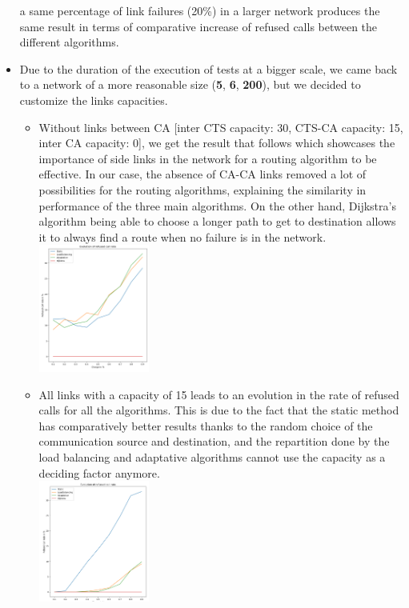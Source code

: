 \documentclass[lettersize,journal]{IEEEtran} %
\begin{document}
\begin{itemize}
        a same percentage of link failures (20\%) in a larger network produces the same result in terms of comparative increase of refused calls
        between the different algorithms. 
        \item Due to the duration of the execution of tests at a bigger scale, we came back to a network of a more reasonable size
        (\textbf{5}, \textbf{6}, \textbf{200}), but we decided to customize the links capacities.
        \begin{itemize}
                \item Without links between CA [inter CTS capacity: 30, CTS-CA capacity: 15, inter CA capacity: 0], we get the result that follows
                which showcases the importance of side links in the network for a routing algorithm to be effective. In our case, the absence
                of CA-CA links removed a lot of possibilities for the routing algorithms, explaining the similarity in performance of the three
                main algorithms. On the other hand, Dijkstra's algorithm being able to choose a longer path to get to destination allows it to
                always find a route when no failure is in the network.
                \includegraphics[width=0.3\textwidth]{images/without_CA_links_1.png}
                \item All links with a capacity of 15 leads to an evolution in the rate of refused calls for
                all the algorithms. This is due to the fact that the static method has comparatively better results thanks to the random choice of the
                communication source and destination, and the repartition done by the load balancing and adaptative algorithms
                cannot use the capacity as a deciding factor anymore.\\
                \includegraphics[width=0.3\textwidth]{images/same_capacities_1.png}

\end{itemize}
\end{itemize}
\end{document}
